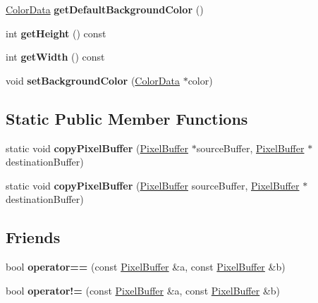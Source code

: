 \begin{DoxyCompactItemize}
\item 
\hypertarget{classPixelBuffer_a36649accdea429915280ba71a7976300}{\hyperlink{classColorData}{Color\-Data} {\bfseries get\-Default\-Background\-Color} ()}\label{classPixelBuffer_a36649accdea429915280ba71a7976300}

\item 
\hypertarget{classPixelBuffer_abd5685a6a23041ed9640da9370eb7839}{int {\bfseries get\-Height} () const }\label{classPixelBuffer_abd5685a6a23041ed9640da9370eb7839}

\item 
\hypertarget{classPixelBuffer_a26dc9286596d27cd416d34611c00602e}{int {\bfseries get\-Width} () const }\label{classPixelBuffer_a26dc9286596d27cd416d34611c00602e}

\item 
\hypertarget{classPixelBuffer_a1838bd976c9c98a79b0c2eb1246b816f}{void {\bfseries set\-Background\-Color} (\hyperlink{classColorData}{Color\-Data} $\ast$color)}\label{classPixelBuffer_a1838bd976c9c98a79b0c2eb1246b816f}

\end{DoxyCompactItemize}
\subsection*{Static Public Member Functions}
\begin{DoxyCompactItemize}
\item 
\hypertarget{classPixelBuffer_afedcf4028903278e8eacbd78d11232ee}{static void {\bfseries copy\-Pixel\-Buffer} (\hyperlink{classPixelBuffer}{Pixel\-Buffer} $\ast$source\-Buffer, \hyperlink{classPixelBuffer}{Pixel\-Buffer} $\ast$destination\-Buffer)}\label{classPixelBuffer_afedcf4028903278e8eacbd78d11232ee}

\item 
\hypertarget{classPixelBuffer_a91bfa4c461b467c0504601a7bc6e29b2}{static void {\bfseries copy\-Pixel\-Buffer} (\hyperlink{classPixelBuffer}{Pixel\-Buffer} source\-Buffer, \hyperlink{classPixelBuffer}{Pixel\-Buffer} $\ast$destination\-Buffer)}\label{classPixelBuffer_a91bfa4c461b467c0504601a7bc6e29b2}

\end{DoxyCompactItemize}
\subsection*{Friends}
\begin{DoxyCompactItemize}
\item 
\hypertarget{classPixelBuffer_a68aef4100a6c7062d102b566dc382543}{bool {\bfseries operator==} (const \hyperlink{classPixelBuffer}{Pixel\-Buffer} \&a, const \hyperlink{classPixelBuffer}{Pixel\-Buffer} \&b)}\label{classPixelBuffer_a68aef4100a6c7062d102b566dc382543}

\item 
\hypertarget{classPixelBuffer_a9751369b6acaba6bc42143cc2b7314ea}{bool {\bfseries operator!=} (const \hyperlink{classPixelBuffer}{Pixel\-Buffer} \&a, const \hyperlink{classPixelBuffer}{Pixel\-Buffer} \&b)}\label{classPixelBuffer_a9751369b6acaba6bc42143cc2b7314ea}

\end{DoxyCompactItemize}



